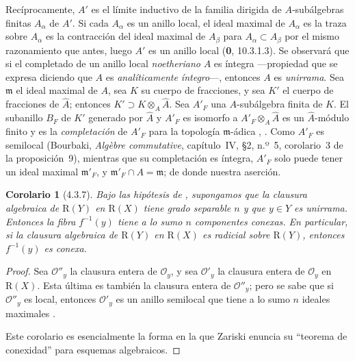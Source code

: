 \documentclass[10pt,oneside,openany]{book}
\theoremstyle{egaenv}\newtheorem*{env}{---}
\theoremstyle{egastatement}
\newtheorem*{corollary}{Corolario}
\theoremstyle{egadescription}
\begin{document}
Recíprocamente, $A'$ es el límite inductivo de la familia dirigida de
$A$-subálgebras finitas $A_\alpha$ de $A'$. Si cada $A_\alpha$ es un anillo local, el ideal maximal
de $A_\alpha$ es la traza sobre $A_\alpha$ es la contracción del ideal maximal de $A_\beta$ para
$A_\alpha\subset A_\beta$ por el mismo razonamiento que antes, luego $A'$ es un anillo local (\textbf{0}, 10.3.1.3). Se observará que si el completado de un anillo local \emph{noetheriano} $A$ es íntegra ---propiedad que se expresa diciendo que
$A$ es \emph{analíticamente íntegro}---, entonces $A$ es \emph{unirrama}.
Sea $\mathfrak m$ el ideal maximal de $A$, sea $K$ su cuerpo de
fracciones, y sea $K'$ el cuerpo de fracciones de $\widehat A$;
entonces
$K'\supset K\otimes_A\widehat A$.
Sea $A'_F$ una $A$-subálgebra finita de $K$. El subanillo $B_F$ de
$K'$ generado por $\widehat A$ y $A'_F$ es isomorfo a
$A'_F\otimes_A\widehat A$
es un $\widehat A$-módulo finito y es la \emph{completación} de $A'_F$
para la topología $\mathfrak m$-ádica
, . Como $A'_F$ es semilocal
(Bourbaki, \emph{Alg\`ebre commutative}, capítulo~IV, \S2, n.º~5,
corolario~3 de la proposición~9), mientras que su completación es
íntegra, $A'_F$ solo puede tener un ideal maximal $\mathfrak m'_F$, y
$\mathfrak m'_F\cap A=\mathfrak m$; de donde nuestra aserción.
\begin{corollary}[4.3.7]
\label{III.4.3.7}
\label{III.4.3.7-fr}
Bajo las hipótesis de \textup{}, supongamos que la clausura
algebraica de $\mathrm R(Y)$ en $\mathrm R(X)$ tiene grado separable
$n$ y que $y\in Y$ es unirrama. Entonces la fibra $f^{-1}(y)$ tiene a
lo sumo $n$ componentes conexas. En particular, si la clausura
algebraica de $\mathrm R(Y)$ en $\mathrm R(X)$ es radicial sobre
$\mathrm R(Y)$, entonces $f^{-1}(y)$ es conexa.
\end{corollary}

\begin{proof}
Sea $\mathcal O''_y$ la clausura entera de $\mathcal O_y$, y sea
$\mathcal O'_y$ la clausura entera de $\mathcal O_y$ en $\mathrm R(X)$.
Esta última es también la clausura entera de $\mathcal O''_y$; pero se sabe que si $\mathcal O''_y$ es local, entonces $\mathcal O'_y$ es
un anillo semilocal que tiene a lo sumo $n$ ideales maximales
\cite[vol.~I, p.~289, Theorem~22]{I-13}.

Este corolario es esencialmente la forma en la que Zariski enuncia su
``teorema de conexidad'' para esquemas algebraicos.
\end{proof}
\end{document}
